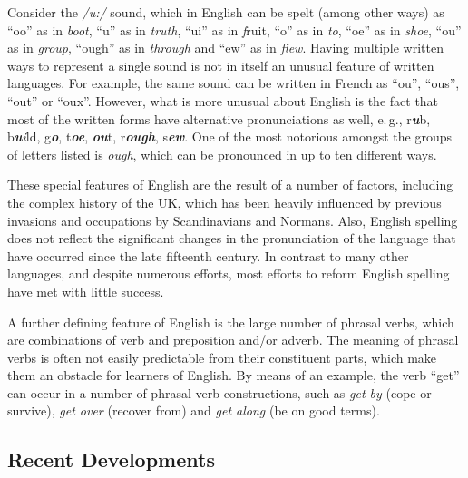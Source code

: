 \documentclass[]{../../metanetpaper}
\begin{document}
\begin{multicols}{2}
Consider the \textit{/u:/} sound, which in English can be spelt (among other ways) as ``oo'' as in \textit{boot}, ``u'' as in \textit{truth}, ``ui'' as in {\textit fruit}, ``o'' as in \textit{to}, ``oe'' as in \textit{shoe}, ``ou'' as in \textit{group}, ``ough'' as in \textit{through} and ``ew'' as in \textit{flew}. Having multiple written ways to represent a single sound is not in itself an unusual feature of written languages. For example, the same sound can be written in French as ``ou'', ``ous'', ``out'' or ``oux''. However, what is more unusual about English is the fact that most of the written forms have alternative pronunciations as well, e.\,g.,  r\textit{\textbf{u}}b, b\textit{\textbf ui}ld, g\textit{\textbf{o}}, t\textit{\textbf{oe}}, \textit{\textbf{ou}}t, r\textit{\textbf{ough}}, s\textit{\textbf{ew}}. One of the most notorious amongst the groups of letters listed is \textit{ough}, which can be pronounced in up to ten different ways. 
   
   
These special features of English are the result of a number of factors, including the complex history of the UK, which has been heavily influenced by previous invasions and occupations by Scandinavians and Normans. Also, English spelling does not reflect the significant changes in the pronunciation of the language that have occurred since the late fifteenth century. In contrast to many other languages, and despite numerous efforts, most efforts to reform English spelling have met with little success.

A further defining feature of English is the large number of phrasal verbs, which are combinations of verb and preposition and/or adverb. The meaning of phrasal verbs is often not easily predictable from their constituent parts, which make them an obstacle for learners of English. By means of an example, the verb ``get'' can occur in a number of phrasal verb constructions, such as \textit{get by} (cope or survive), \textit{get over} (recover from) and \textit{get along} (be on good terms).
   

\subsection{Recent Developments}


\end{multicols}
\end{document}
